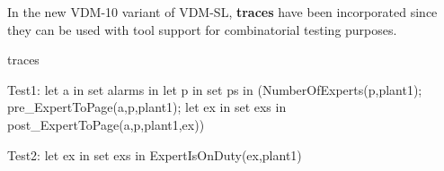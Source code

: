 In the new VDM-10 variant of VDM-SL, {\bf\ttfamily traces} have been incorporated since they can be used with tool support for combinatorial testing purposes.

\begin{vdmsl}
traces

  Test1: let a in set alarms
         in
           let p in set ps 
           in
             (NumberOfExperts(p,plant1);
              pre_ExpertToPage(a,p,plant1);
              let ex in set exs
              in
                post_ExpertToPage(a,p,plant1,ex))
               
  Test2: let ex in set exs
         in
           ExpertIsOnDuty(ex,plant1)
\end{vdmsl}  
